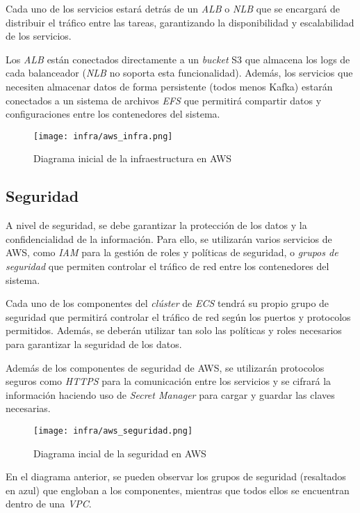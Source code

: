 Cada uno de los servicios estará detrás de un \textit{ALB} o \textit{NLB} que se
encargará de distribuir el tráfico entre las tareas, garantizando la
disponibilidad y escalabilidad de los servicios.

Los \textit{ALB} están conectados directamente a un \textit{bucket} S3 que
almacena los logs de cada balanceador (\textit{NLB} no soporta esta
funcionalidad). Además, los servicios que necesiten almacenar datos de forma
persistente (todos menos Kafka) estarán conectados a un sistema de archivos
\textit{EFS} que permitirá compartir datos y configuraciones entre los
contenedores del sistema.

\begin{figure}[H]
	\centerline{\texttt{[image: infra/aws\_infra.png]}}
	\caption{Diagrama inicial de la infraestructura en AWS}
	\label{fig:aws_infra}
\end{figure}


\newpage{}
\subsection{Seguridad}\label{subsec:seguridad}
A nivel de seguridad, se debe garantizar la protección de los datos y la
confidencialidad de la información. Para ello, se utilizarán varios servicios de
AWS, como \textit{IAM} para la gestión de roles y políticas de seguridad, o
\textit{grupos de seguridad} que permiten controlar el tráfico de red entre los
contenedores del sistema.

Cada uno de los componentes del \textit{clúster} de \textit{ECS} tendrá su
propio grupo de seguridad que permitirá controlar el tráfico de red según los
puertos y protocolos permitidos. Además, se deberán utilizar tan solo las
políticas y roles necesarios para garantizar la seguridad de los datos.

Además de los componentes de seguridad de AWS, se utilizarán protocolos seguros
como \textit{HTTPS} para la comunicación entre los servicios y se cifrará la
información haciendo uso de \textit{Secret Manager} para cargar y guardar las
claves necesarias.


\begin{figure}[H]
	\centerline{\texttt{[image: infra/aws\_seguridad.png]}}
	\caption{Diagrama incial de la seguridad en AWS}
	\label{fig:aws_seguridad}
\end{figure}

En el diagrama anterior, se pueden observar los grupos de seguridad (resaltados
en azul) que engloban a los componentes, mientras que todos ellos se encuentran
dentro de una \textit{VPC}.


